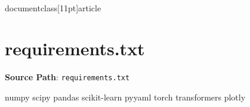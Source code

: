 \\documentclass[11pt]{article}
\begin{document}
\section*{requirements.txt}
\textbf{Source Path}: \texttt{requirements.txt}\par
\bigskip
\begin{CodeBlock}
numpy
scipy
pandas
scikit-learn
pyyaml
torch
transformers
plotly

\end{CodeBlock}
\end{document}

